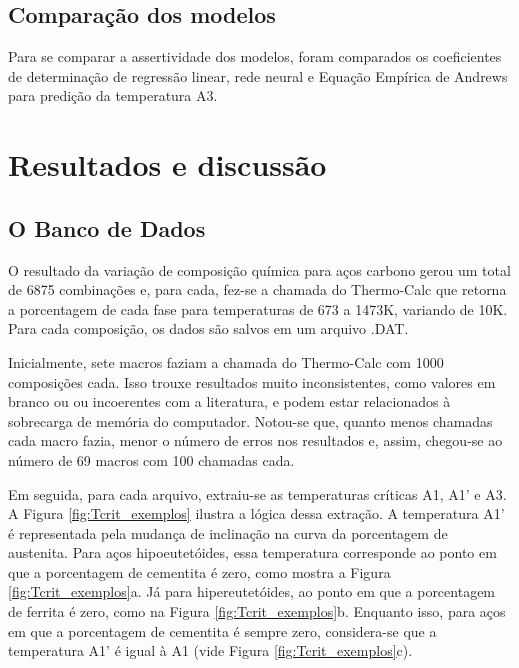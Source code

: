 \documentclass[brazil,tf,epusp]{usp}  %
\begin{document}
\section{Comparação dos modelos}

Para se comparar a assertividade dos modelos, foram comparados os coeficientes de determinação de regressão linear, rede neural e Equação Empírica de Andrews para predição da temperatura A3.

\chapter{Resultados e discussão}

\section{O Banco de Dados}

O resultado da variação de composição química para aços carbono gerou um total de 6875 combinações e, para cada, fez-se a chamada do Thermo-Calc\textregistered{} que retorna a porcentagem de cada fase para temperaturas de 673 a 1473K, variando de 10K. Para cada composição, os dados são salvos em um arquivo .DAT.

Inicialmente, sete macros faziam a chamada do Thermo-Calc\textregistered{} com 1000 composições cada. Isso trouxe resultados muito inconsistentes, como valores em branco ou ou incoerentes com a literatura, e podem estar relacionados à sobrecarga de memória do computador. Notou-se que, quanto menos chamadas cada macro fazia, menor o número de erros nos resultados e, assim, chegou-se ao número de 69 macros com 100 chamadas cada.

Em seguida, para cada arquivo, extraiu-se as temperaturas críticas A1, A1' e A3. A Figura \ref{fig:Tcrit_exemplos} ilustra a lógica dessa extração. A temperatura A1' é representada pela mudança de inclinação na curva da porcentagem de austenita. Para aços hipoeutetóides, essa temperatura corresponde ao ponto em que a porcentagem de cementita é zero, como mostra a Figura \ref{fig:Tcrit_exemplos}a. Já para hipereutetóides, ao ponto em que a porcentagem de ferrita é zero, como na Figura \ref{fig:Tcrit_exemplos}b. Enquanto isso, para aços em que a porcentagem de cementita é sempre zero, considera-se que a temperatura A1' é igual à A1 (vide Figura \ref{fig:Tcrit_exemplos}c).
\end{document}
